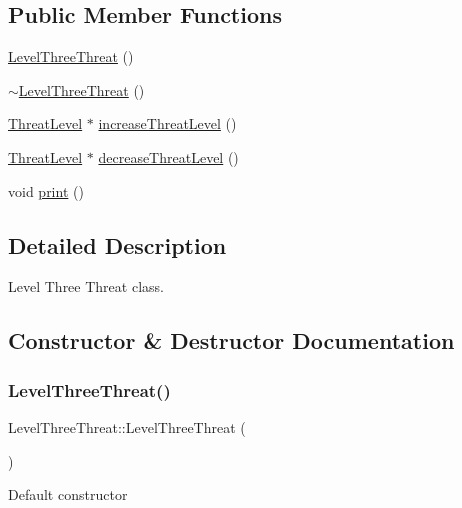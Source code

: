 \subsection*{Public Member Functions}
\begin{DoxyCompactItemize}
\item 
\hyperlink{classLevelThreeThreat_a5c9b00bc5cd2459c7b1adf2542afc702}{Level\+Three\+Threat} ()
\item 
\hyperlink{classLevelThreeThreat_ab5caa48c8913099e0a3520ce6849b295}{$\sim$\+Level\+Three\+Threat} ()
\item 
\hyperlink{classThreatLevel}{Threat\+Level} $\ast$ \hyperlink{classLevelThreeThreat_a284c2b79a9a85f5e164f15c258c6e9ca}{increase\+Threat\+Level} ()
\item 
\hyperlink{classThreatLevel}{Threat\+Level} $\ast$ \hyperlink{classLevelThreeThreat_a98337ab08fe61b136d9c9e48f7ace804}{decrease\+Threat\+Level} ()
\item 
void \hyperlink{classLevelThreeThreat_a3bdd7e61f3938123ce9c705623e0d98a}{print} ()
\end{DoxyCompactItemize}


\subsection{Detailed Description}
Level Three Threat class. 

\subsection{Constructor \& Destructor Documentation}
\mbox{\label{classLevelThreeThreat_a5c9b00bc5cd2459c7b1adf2542afc702}} 
\subsubsection{\texorpdfstring{Level\+Three\+Threat()}{LevelThreeThreat()}}
{\footnotesize\ttfamily Level\+Three\+Threat\+::\+Level\+Three\+Threat (\begin{DoxyParamCaption}{ }\end{DoxyParamCaption})}

Default constructor \mbox{\label{classLevelThreeThreat_ab5caa48c8913099e0a3520ce6849b295}} 
